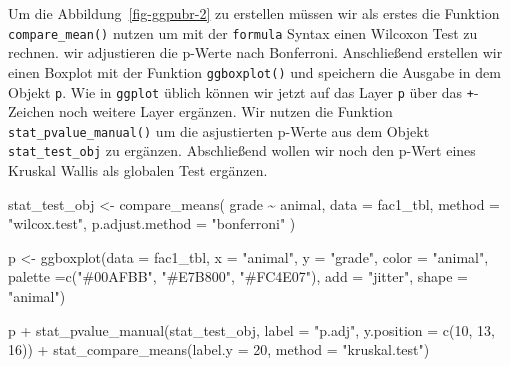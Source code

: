 \documentclass[
  letterpaper,
  DIV=11,
  oneside]{scrreport}
\newenvironment{Shaded}{\begin{snugshade}}{\end{snugshade}}
\newcommand{\AttributeTok}[1]{\textcolor[rgb]{0.40,0.45,0.13}{#1}}
\newcommand{\DecValTok}[1]{\textcolor[rgb]{0.68,0.00,0.00}{#1}}
\newcommand{\FunctionTok}[1]{\textcolor[rgb]{0.28,0.35,0.67}{#1}}
\newcommand{\NormalTok}[1]{\textcolor[rgb]{0.00,0.23,0.31}{#1}}
\newcommand{\OtherTok}[1]{\textcolor[rgb]{0.00,0.23,0.31}{#1}}
\newcommand{\SpecialCharTok}[1]{\textcolor[rgb]{0.37,0.37,0.37}{#1}}
\newcommand{\StringTok}[1]{\textcolor[rgb]{0.13,0.47,0.30}{#1}}
\begin{document}
Um die Abbildung~\ref{fig-ggpubr-2} zu erstellen müssen wir als erstes
die Funktion \texttt{compare\_mean()} nutzen um mit der \texttt{formula}
Syntax einen Wilcoxon Test zu rechnen. wir adjustieren die p-Werte nach
Bonferroni. Anschließend erstellen wir einen Boxplot mit der Funktion
\texttt{ggboxplot()} und speichern die Ausgabe in dem Objekt \texttt{p}.
Wie in \texttt{ggplot} üblich können wir jetzt auf das Layer \texttt{p}
über das \texttt{+}-Zeichen noch weitere Layer ergänzen. Wir nutzen die
Funktion \texttt{stat\_pvalue\_manual()} um die asjustierten p-Werte aus
dem Objekt \texttt{stat\_test\_obj} zu ergänzen. Abschließend wollen wir
noch den p-Wert eines Kruskal Wallis als globalen Test ergänzen.

\begin{Shaded}
\begin{Highlighting}[]
\NormalTok{stat\_test\_obj }\OtherTok{\textless{}{-}} \FunctionTok{compare\_means}\NormalTok{(}
\NormalTok{ grade }\SpecialCharTok{\textasciitilde{}}\NormalTok{ animal, }\AttributeTok{data =}\NormalTok{ fac1\_tbl,}
 \AttributeTok{method =} \StringTok{"wilcox.test"}\NormalTok{,}
 \AttributeTok{p.adjust.method =} \StringTok{"bonferroni"}
\NormalTok{)}

\NormalTok{p }\OtherTok{\textless{}{-}} \FunctionTok{ggboxplot}\NormalTok{(}\AttributeTok{data =}\NormalTok{ fac1\_tbl, }\AttributeTok{x =} \StringTok{"animal"}\NormalTok{, }\AttributeTok{y =} \StringTok{"grade"}\NormalTok{,}
               \AttributeTok{color =} \StringTok{"animal"}\NormalTok{, }\AttributeTok{palette =}\FunctionTok{c}\NormalTok{(}\StringTok{"\#00AFBB"}\NormalTok{, }\StringTok{"\#E7B800"}\NormalTok{, }\StringTok{"\#FC4E07"}\NormalTok{),}
               \AttributeTok{add =} \StringTok{"jitter"}\NormalTok{, }\AttributeTok{shape =} \StringTok{"animal"}\NormalTok{)}

\NormalTok{p }\SpecialCharTok{+} \FunctionTok{stat\_pvalue\_manual}\NormalTok{(stat\_test\_obj, }\AttributeTok{label =} \StringTok{"p.adj"}\NormalTok{, }\AttributeTok{y.position =} \FunctionTok{c}\NormalTok{(}\DecValTok{10}\NormalTok{, }\DecValTok{13}\NormalTok{, }\DecValTok{16}\NormalTok{)) }\SpecialCharTok{+}
  \FunctionTok{stat\_compare\_means}\NormalTok{(}\AttributeTok{label.y =} \DecValTok{20}\NormalTok{, }\AttributeTok{method =} \StringTok{"kruskal.test"}\NormalTok{)    }
\end{Highlighting}
\end{Shaded}
\end{document}
